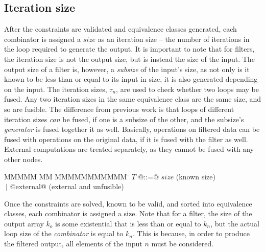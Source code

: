 \subsection{Iteration size}
After the constraints are validated and equivalence classes generated, each combinator is assigned a $size$ as an iteration size -- the number of iterations in the loop required to generate the output.
It is important to note that for filters, the iteration size is not the output size, but is instead the size of the input.
The output size of a filter is, however, a \emph{subsize} of the input's size, as not only is it known to be less than or equal to its input in size, it is also generated depending on the input.
The iteration sizes, $\tau_n$, are used to check whether two loops may be fused.
Any two iteration sizes in the same equivalence class are the same size, and so are fusible.
The difference from previous work is that loops of different iteration sizes \emph{can} be fused, if one is a subsize of the other, and the subsize's \emph{generator} is fused together it as well.
Basically, operations on filtered data can be fused with operations on the original data, if it is fused with the filter as well.
External computations are treated separately, as they cannot be fused with any other nodes.

\begin{tabbing}
MMMMM       \= MM \= MMMMMMMMMMM \= \kill
$T$          \> @::=@ \> $size$                                  \> (known size) \\
             \> $~|$  \> @external@                              \> (external and unfusible) \\
\end{tabbing}

Once the constraints are solved, known to be valid, and sorted into equivalence classes, each combinator is assigned a size.
Note that for a filter, the size of the output array $k_o$ is some existential that is less than or equal to $k_n$, but the actual loop size of the \emph{combinator} is equal to $k_n$.
This is because, in order to produce the filtered output, all elements of the input $n$ must be considered.


